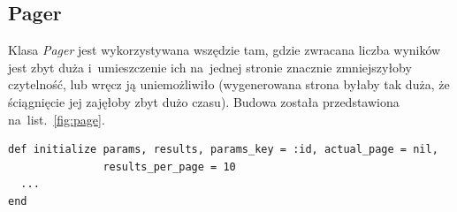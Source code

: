 \documentclass[a4paper,12pt,oneside]{report}
\begin{document}
\subsection{Pager}
\label{sub:pager}
Klasa \emph{Pager} jest wykorzystywana wszędzie tam, gdzie zwracana liczba wyników jest zbyt duża i~umieszczenie ich na~jednej stronie znacznie zmniejszyłoby czytelność, lub wręcz ją uniemożliwiło (wygenerowana strona byłaby tak duża, że ściągnięcie jej zajęłoby zbyt dużo czasu). Budowa została przedstawiona na~list.~\ref{fig:page}.

\begin{lstlisting}[caption={Struktura konstruktora klasy \emph{Pager}},label=fig:page,captionpos=b]
def initialize params, results, params_key = :id, actual_page = nil,
               results_per_page = 10
  ...
end
\end{lstlisting}
\end{document}
